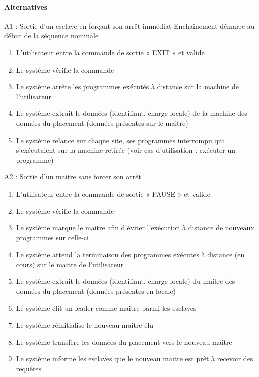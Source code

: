     \paragraph{Alternatives}
    A1 : Sortie d'un esclave en forçant son arrêt immédiat
            Enchainement démarre au début de la séquence nominale
        \begin{enumerate}
          \item L'utilisateur entre la commande de sortie « EXIT » et valide
          \item Le système vérifie la commande
          \item Le système arrête les programmes exécutés à distance sur la machine de l'utilisateur
          \item Le système extrait le données (identifiant, charge locale) de la machine des données du
              placement (données présentes sur le maitre)
          \item Le système relance sur chaque site, ses programmes interrompu qui s'exécutaient sur la
              machine retirée (voir cas d'utilisation : exécuter un programme)
        \end{enumerate}
    A2 : Sortie d'un maitre sans forcer son arrêt
        \begin{enumerate}
          \item L'utilisateur entre la commande de sortie « PAUSE » et valide
          \item Le système vérifie la commande
          \item Le système marque le maitre afin d'éviter l'exécution à distance de nouveaux programmes
              sur celle-ci
          \item Le système attend la terminaison des programmes exécutes à distance (en cours) sur le
              maitre de l'utilisateur
          \item Le système extrait le données (identifiant, charge locale) du maitre des données du
              placement (données présentes en locale)
          \item Le système élit un leader comme maitre parmi les esclaves
          \item Le système réinitialise le nouveau maitre élu
          \item Le système transfère les données du placement vers le nouveau maitre
          \item Le système informe les esclaves que le nouveau maitre est prêt à recevoir des requêtes
        \end{enumerate}
